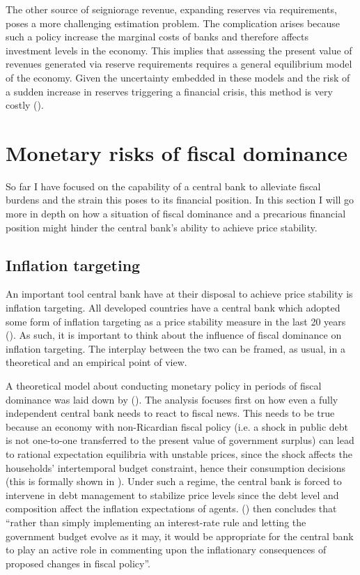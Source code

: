 \documentclass[american]{scrartcl}
\newcommand{\citein}[1]{\citeauthor{#1} (\citeyear{#1})}
\begin{document}
The other source of seigniorage revenue, expanding reserves via requirements, poses a more challenging estimation problem. The complication arises because such a policy increase the marginal costs of banks and therefore affects investment levels in the economy. This implies that assessing the present value of revenues generated via reserve requirements requires a general equilibrium model of the economy. Given the uncertainty embedded in these models and the risk of a sudden increase in reserves triggering a financial crisis, this method is very costly (\cite{Hoggarth2002}).

\section{Monetary risks of fiscal dominance}

So far I have focused on the capability of a central bank to alleviate fiscal burdens and the strain this poses to its financial position. In this section I will go more in depth on how a situation of fiscal dominance and a precarious financial position might hinder the central bank's ability to achieve price stability.

\subsection{Inflation targeting}

An important tool central bank have at their disposal to achieve price stability is inflation targeting. All developed countries have a central bank which adopted some form of inflation targeting as a price stability measure in the last 20 years (\cite{Ahmed2021}). As such, it is important to think about the influence of fiscal dominance on inflation targeting. The interplay between the two can be framed, as usual, in a theoretical and an empirical point of view.

A theoretical model about conducting monetary policy in periods of fiscal dominance was laid down by \citein{Woodford1998}. The analysis focuses first on how even a fully independent central bank needs to react to fiscal news. This needs to be true because an economy with non-Ricardian fiscal policy (i.e. a shock in public debt is not one-to-one transferred to the present value of government surplus) can lead to rational expectation equilibria with unstable prices, since the shock affects the households' intertemporal budget constraint, hence their consumption decisions (this is formally shown in \cite[p. 123]{Woodford1998}). Under such a regime, the central bank is forced to intervene in debt management to stabilize price levels since the debt level and composition affect the inflation expectations of agents. \citein{Woodford1998} then concludes that “rather than simply implementing an interest-rate rule and letting the government budget evolve as it may, it would be appropriate for the central bank to play an active role in commenting upon the inflationary consequences of proposed changes in fiscal policy”.
\end{document}

